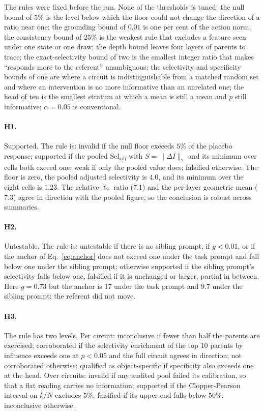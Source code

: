 The rules were fixed before the run. None of the thresholds is tuned: the null
bound of $5\%$ is the level below which the floor could not change the
direction of a ratio near one; the grounding bound of $0.01$ is one per cent of
the action norm; the consistency bound of $25\%$ is the weakest rule that
excludes a feature seen under one state or one draw; the depth bound leaves
four layers of parents to trace; the exact-selectivity bound of two is the
smallest integer ratio that makes ``responds more to the referent''
unambiguous; the selectivity and specificity bounds of one are where a circuit
is indistinguishable from a matched random set and where an intervention is no
more informative than an unrelated one; the head of ten is the smallest stratum
at which a mean is still a mean and $p$ still informative; $\alpha=0.05$ is
conventional.

\paragraph{H1.} Supported. The rule is: invalid if the null floor exceeds
$5\%$ of the placebo response; supported if the pooled
$\mathrm{Sel}_{\mathrm{adj}}$ with $S=\lVert\Delta I\rVert_2$ and its minimum
over cells both exceed one; weak if only the pooled value does; falsified
otherwise. The floor is zero, the pooled adjusted selectivity is $4.0$, and its
minimum over the eight cells is $1.23$. The relative-$\ell_2$ ratio ($7.1$) and
the per-layer geometric mean ($7.3$) agree in direction with the pooled figure,
so the conclusion is robust across summaries.

\paragraph{H2.} Untestable. The rule is: untestable if there is no sibling
prompt, if $g<0.01$, or if the anchor of Eq.~\ref{eq:anchor} does not exceed
one under the task prompt and fall below one under the sibling prompt;
otherwise supported if the sibling prompt's selectivity falls below one,
falsified if it is unchanged or larger, partial in between. Here $g=0.73$ but
the anchor is $17$ under the task prompt and $9.7$ under the sibling prompt:
the referent did not move.

\paragraph{H3.} The rule has two levels. Per circuit: inconclusive if fewer
than half the parents are exercised; corroborated if the selectivity enrichment
of the top $10$ parents by influence exceeds one at $p<0.05$ and the full
circuit agrees in direction; not corroborated otherwise; qualified as
object-specific if specificity also exceeds one at the head. Over circuits:
invalid if any audited pool failed its calibration, so that a flat reading
carries no information; supported if the Clopper-Pearson interval on $k/N$
excludes $5\%$; falsified if its upper end falls below $50\%$; inconclusive
otherwise.

